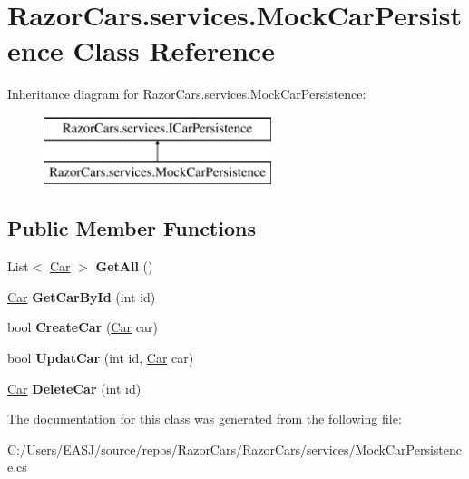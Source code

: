 \hypertarget{class_razor_cars_1_1services_1_1_mock_car_persistence}{}\section{Razor\+Cars.\+services.\+Mock\+Car\+Persistence Class Reference}
\label{class_razor_cars_1_1services_1_1_mock_car_persistence}
Inheritance diagram for Razor\+Cars.\+services.\+Mock\+Car\+Persistence\+:\begin{figure}[H]
\begin{center}
\leavevmode
\includegraphics[height=2.000000cm]{class_razor_cars_1_1services_1_1_mock_car_persistence}
\end{center}
\end{figure}
\subsection*{Public Member Functions}
\begin{DoxyCompactItemize}
\item 
\mbox{\label{class_razor_cars_1_1services_1_1_mock_car_persistence_a85bbd2e5b99405a9185b269ec1037d55}} 
List$<$ \mbox{\hyperlink{class_razor_cars_1_1model_1_1_car}{Car}} $>$ {\bfseries Get\+All} ()
\item 
\mbox{\label{class_razor_cars_1_1services_1_1_mock_car_persistence_a325721c6a08580cdaa978c6572163ca8}} 
\mbox{\hyperlink{class_razor_cars_1_1model_1_1_car}{Car}} {\bfseries Get\+Car\+By\+Id} (int id)
\item 
\mbox{\label{class_razor_cars_1_1services_1_1_mock_car_persistence_abf2c6e82f2df9b58fee3290b32315637}} 
bool {\bfseries Create\+Car} (\mbox{\hyperlink{class_razor_cars_1_1model_1_1_car}{Car}} car)
\item 
\mbox{\label{class_razor_cars_1_1services_1_1_mock_car_persistence_a8d2b39f8f020035f8d12f49cb9603f3c}} 
bool {\bfseries Updat\+Car} (int id, \mbox{\hyperlink{class_razor_cars_1_1model_1_1_car}{Car}} car)
\item 
\mbox{\label{class_razor_cars_1_1services_1_1_mock_car_persistence_a9fe2776190abec7090f79e2b50a6cd07}} 
\mbox{\hyperlink{class_razor_cars_1_1model_1_1_car}{Car}} {\bfseries Delete\+Car} (int id)
\end{DoxyCompactItemize}


The documentation for this class was generated from the following file\+:\begin{DoxyCompactItemize}
\item 
C\+:/\+Users/\+E\+A\+S\+J/source/repos/\+Razor\+Cars/\+Razor\+Cars/services/Mock\+Car\+Persistence.\+cs\end{DoxyCompactItemize}
